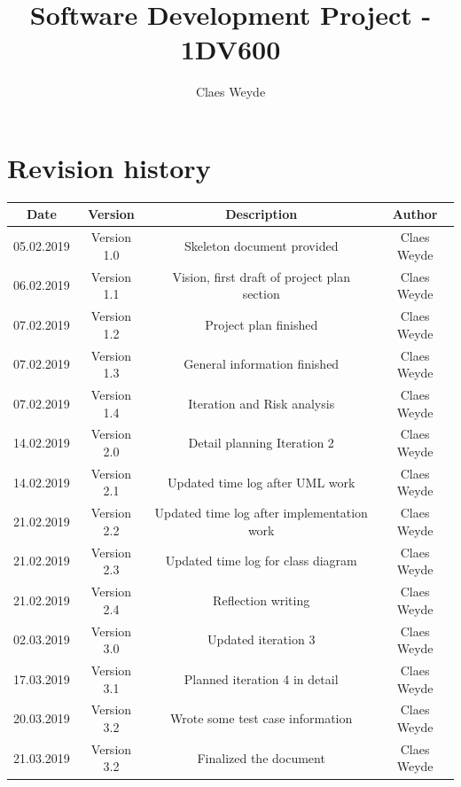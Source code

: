 \documentclass[12pt, letterpaper]{article}
\title{Software Development Project - 1DV600}
\author{Claes Weyde}
\begin{document}
\maketitle
\newpage
\tableofcontents{}
\newpage

\section{Revision history}
\begin{center}
	\begin{tabular}{|c|c|c|c|} 
		\hline
		Date & Version & Description & Author \\ [0.5ex] 
		\hline\hline
		05.02.2019 & Version 1.0 & Skeleton document provided & Claes Weyde \\
		\hline
		06.02.2019 & Version 1.1 & Vision, first draft of project plan section & 
		Claes Weyde \\
		\hline
		07.02.2019 & Version 1.2 & Project plan finished & Claes Weyde \\ [1ex] 
		\hline
		07.02.2019 & Version 1.3 & General information finished & Claes Weyde \\
		\hline
		07.02.2019 & Version 1.4 & Iteration and Risk analysis & Claes Weyde \\ 
		\hline
		14.02.2019 & Version 2.0 & Detail planning Iteration 2 & Claes Weyde \\
		\hline
		14.02.2019 & Version 2.1 & Updated time log after UML work & Claes Weyde \\
		\hline
		21.02.2019 & Version 2.2 & Updated time log after implementation work & Claes Weyde \\
		\hline
		21.02.2019 & Version 2.3 & Updated time log for class diagram & Claes Weyde \\
		\hline
		21.02.2019 & Version 2.4 & Reflection writing & Claes Weyde \\
		\hline
		02.03.2019 & Version 3.0 & Updated iteration 3 & Claes Weyde \\
		\hline
		17.03.2019 & Version 3.1 & Planned iteration 4 in detail & Claes Weyde \\
		\hline
		20.03.2019 & Version 3.2 & Wrote some test case information & Claes Weyde \\
		\hline
		21.03.2019 & Version 3.2 & Finalized the document & Claes Weyde \\
		[1ex]
		\hline
		
	\end{tabular}
\end{center}
\newpage
\end{document}
